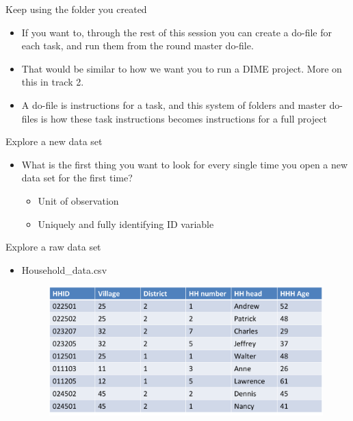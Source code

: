 \documentclass[aspectratio=169]{beamer}
\begin{document}
\begin{frame}{Keep using the folder you created}
\begin{itemize}
	\item If you want to, through the rest of this session you can create a do-file for each task, and run them from the round master do-file.	
	\item That would be similar to how we want you to run a DIME project. More on this in track 2.
	\item A do-file is instructions for a task, and this system of folders and master do-files is how these task instructions becomes instructions for a full project 
\end{itemize}
\end{frame}



\begin{frame}{Explore a new data set}
\begin{itemize}
	\item What is the first thing you want to look for every single time you open a new data set for the first time?
		\begin{itemize}
			\item Unit of observation
			\item Uniquely and fully identifying ID variable
		\end{itemize}
\end{itemize}
\end{frame}



\begin{frame}{Explore a raw data set}
\begin{itemize}
	\item Household\_data.csv
	\begin{figure}
		\centering
		\includegraphics[width=\linewidth]{img/raw1}
	\end{figure}
\end{itemize}
\end{frame}
\end{document}
